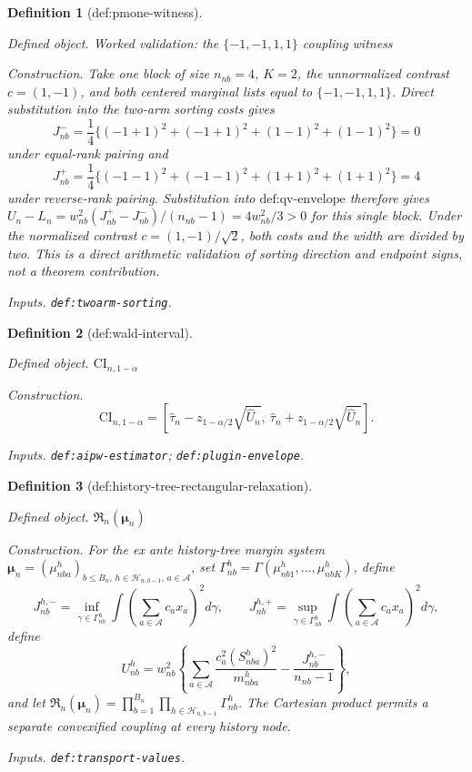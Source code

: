 \documentclass{article}
\newtheorem{definition}{Definition}
\begin{document}
\begin{definition}[def:pmone-witness]\label{def:pmone-witness}
\par\smallskip\noindent\emph{Defined object.} Worked validation: the \(\{-1,-1,1,1\}\) coupling witness
\par\smallskip\noindent\emph{Construction.} Take one block of size \(n_{nb}=4\), \(K=2\), the unnormalized contrast \(c=(1,-1)\), and both centered marginal lists equal to \(\{-1,-1,1,1\}\). Direct substitution into the two-arm sorting costs gives \[J_{nb}^{-}=\frac14\{(-1+1)^2+(-1+1)^2+(1-1)^2+(1-1)^2\}=0\] under equal-rank pairing and \[J_{nb}^{+}=\frac14\{(-1-1)^2+(-1-1)^2+(1+1)^2+(1+1)^2\}=4\] under reverse-rank pairing. Substitution into \(\text{def:qv-envelope}\) therefore gives \(U_n-L_n=w_{nb}^2(J_{nb}^{+}-J_{nb}^{-})/(n_{nb}-1)=4w_{nb}^2/3>0\) for this single block. Under the normalized contrast \(c=(1,-1)/\sqrt2\), both costs and the width are divided by two. This is a direct arithmetic validation of sorting direction and endpoint signs, not a theorem contribution.
\par\smallskip\noindent\emph{Inputs.} \texttt{def:\allowbreak{}twoarm-\allowbreak{}sorting}.
\end{definition}

\begin{definition}[def:wald-interval]\label{def:wald-interval}
\par\smallskip\noindent\emph{Defined object.} \(\mathrm{CI}_{n,1-\alpha}\)
\par\smallskip\noindent\emph{Construction.} \[\mathrm{CI}_{n,1-\alpha}=\left[\widehat\tau_n-z_{1-\alpha/2}\sqrt{\widehat U_n},\ \widehat\tau_n+z_{1-\alpha/2}\sqrt{\widehat U_n}\right].\]
\par\smallskip\noindent\emph{Inputs.} \texttt{def:\allowbreak{}aipw-\allowbreak{}estimator}; \texttt{def:\allowbreak{}plugin-\allowbreak{}envelope}.
\end{definition}

\begin{definition}[def:history-tree-rectangular-relaxation]\label{def:history-tree-rectangular-relaxation}
\par\smallskip\noindent\emph{Defined object.} \(\mathfrak R_n(\boldsymbol\mu_n)\)
\par\smallskip\noindent\emph{Construction.} For the ex ante history-tree margin system \(\boldsymbol\mu_n=(\mu_{nba}^{h})_{b\le B_n,\,h\in\mathcal H_{n,b-1},\,a\in\mathcal A}\), set \(\Gamma_{nb}^{h}=\Gamma(\mu_{nb1}^{h},\ldots,\mu_{nbK}^{h})\), define \[J_{nb}^{h,-}=\inf_{\gamma\in\Gamma_{nb}^{h}}\int(\sum_{a\in\mathcal A}c_ax_a)^2d\gamma,\qquad J_{nb}^{h,+}=\sup_{\gamma\in\Gamma_{nb}^{h}}\int(\sum_{a\in\mathcal A}c_ax_a)^2d\gamma,\] define \[U_{nb}^{h}=w_{nb}^2\left\{\sum_{a\in\mathcal A}\frac{c_a^2(S_{nba}^{h})^2}{m_{nba}^{h}}-\frac{J_{nb}^{h,-}}{n_{nb}-1}\right\},\] and let \(\mathfrak R_n(\boldsymbol\mu_n)=\prod_{b=1}^{B_n}\prod_{h\in\mathcal H_{n,b-1}}\Gamma_{nb}^{h}\). The Cartesian product permits a separate convexified coupling at every history node.
\par\smallskip\noindent\emph{Inputs.} \texttt{def:\allowbreak{}transport-\allowbreak{}values}.
\end{definition}
\end{document}
